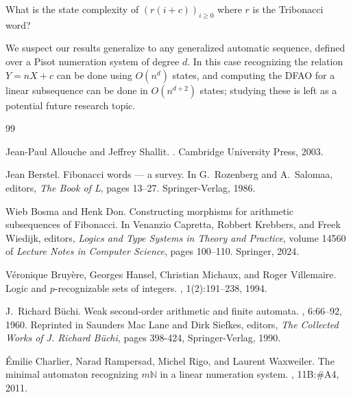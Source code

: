 \documentclass[12pt,reqno]{article}
\def\Enn{\mathbb{N}}
\begin{document}
\begin{problem}
    What is the state complexity of $(r(i+c))_{i \geq 0}$ where $r$ is the Tribonacci word?
\end{problem}

We suspect our results generalize to any generalized automatic sequence, defined over a Pisot numeration system of degree $d$.  In this case recognizing the relation $Y = nX+ c$ can be done using $O(n^d)$ states, and computing the DFAO for a linear subsequence can be done in $O(n^{d+2})$ states; studying these is left as a potential future research topic.


\begin{thebibliography}{99}

Jean-Paul Allouche and Jeffrey Shallit.
.
\newblock Cambridge University Press, 2003.

Jean Berstel.
\newblock Fibonacci words — a survey.
\newblock In G.~Rozenberg and A.~Salomaa, editors, {\em The {Book} of {L}},
  pages 13--27. Springer-Verlag, 1986.

Wieb Bosma and Henk Don.
\newblock Constructing morphisms for arithmetic subsequences of {Fibonacci}.
\newblock In Venanzio Capretta, Robbert Krebbers, and Freek Wiedijk, editors,
  {\em Logics and {Type} {Systems} in {Theory} and {Practice}}, volume 14560 of
  {\em Lecture {Notes} in {Computer} {Science}}, pages 100--110. Springer,
  2024.

V{\'e}ronique Bruy{\`e}re, Georges Hansel, Christian Michaux, and Roger
  Villemaire.
\newblock Logic and $p$-recognizable sets of integers.
,
  1(2):191--238, 1994.

J.~Richard B{\"u}chi.
\newblock Weak second-order arithmetic and finite automata.
, 6:66--92, 1960.
\newblock Reprinted in Saunders Mac Lane and Dirk Siefkes, editors, {\it The
  Collected Works of J. Richard B{\"u}chi}, pages 398-424, Springer-Verlag,
  1990.

{\'E}milie Charlier, Narad Rampersad, Michel Rigo, and Laurent Waxweiler.
\newblock The minimal automaton recognizing $m {\Enn}$ in a linear numeration
  system.
, 11B:\#A4, 2011.


\end{thebibliography}
\end{document}
